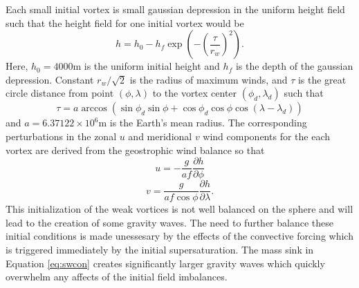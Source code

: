   Each small initial vortex is small gaussian depression
  in the uniform height field such that the height field for one initial vortex would be
  \begin{equation}
    \label{eq:hforce} h = h_0 - h_{f} \exp{\left(-\left(\frac{\tau}
    {r_w}\right)^2\right)}.
  \end{equation}
 Here, $h_0 = 4000 \mathrm{ m}$ is the uniform initial height and $h_f$ is the depth 
 of the gaussian depression. Constant $r_w / \sqrt{2}$ 
 is the radius of maximum winds, and $\tau$ is the great circle distance from
 point $(\phi, \lambda)$ to the vortex center $(\phi_d, \lambda_d)$ such that
  \begin{equation}
    \label{eq:gcd} \tau = a \arccos \left(\sin\phi_d \sin\phi + \cos\phi_d
    \cos\phi \cos\left(\lambda - \lambda_d\right)\right)
  \end{equation}
  and $a = 6.37122 \times 10^6 \mathrm{ m}$ is the Earth's mean radius. 
  The corresponding perturbations in the zonal $u$ and meridional $v$ wind  
  components for the each vortex are derived from the geostrophic 
  wind balance so that
  \begin{equation}
     \label{eq:uforce} u = -\frac{g}{af}\frac{\partial h}{\partial \phi}
   \end{equation}
  \begin{equation}
     \label{eq:vforce} v = \frac{g}{af\cos\phi}\frac{\partial h}{\partial \lambda}.
   \end{equation}
  This initialization of the weak vortices is not well balanced on the sphere and 
  will lead to the creation of some gravity waves. The need to further balance
  these initial conditions is made unessesary by the effects of the convective forcing 
  which is triggered immediately by the initial supersaturation.
   The mass sink in Equation \ref{eq:swcon} creates significantly larger gravity waves
   which quickly overwhelm any affects of the initial field imbalances. 
  
